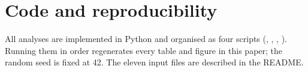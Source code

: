 \documentclass{apmcmthesis}
\begin{document}
\section{Code and reproducibility}
All analyses are implemented in Python and organised as four scripts
(, ,
, ).
Running them in order regenerates every table and figure in this paper; the random seed is
fixed at 42. The eleven input files are described in the README.
\end{document}
